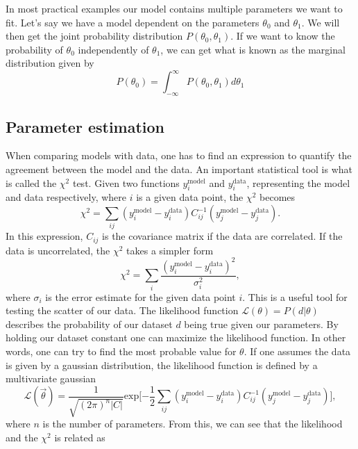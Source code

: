 In most practical examples our model contains multiple parameters we want to fit. Let's say we have a model
dependent on the parameters $\theta_0$ and $\theta_1$. We will then get the joint probability distribution $P(\theta_0, \theta_1)$.
If we want to know the probability of $\theta_0$ independently of $\theta_1$, we can get what is known as the marginal distribution given by
\begin{equation}
    P(\theta_0)=\int_{-\infty}^{\infty}P(\theta_0, \theta_1)d\theta_1
\end{equation}

\subsection{Parameter estimation}
When comparing models with data, one has to find an expression to quantify the
agreement between the model and the data. An important statistical tool is what
is called the $\chi^2$ test. Given two functions $y^{\mathrm{model}}_i$ and $y^{\mathrm{data}}_i$,
representing the model and data respectively, where $i$ is a given data point,
the $\chi^2$ becomes
\begin{equation}
    \chi^2=\sum_{ij}(y^{\mathrm{model}}_i-y^{\mathrm{data}}_i)C_{ij}^{-1}(y^{\mathrm{model}}_j-y^{\mathrm{data}}_j).
\end{equation}
In this expression, $C_{ij}$ is the covariance matrix if the data are correlated. If the data
is uncorrelated, the $\chi^2$ takes a simpler form
\begin{equation}
    \chi^2=\sum_{i}\frac{(y^{\mathrm{model}}_i-y^{\mathrm{data}}_i)^2}{\sigma_i^2},
\end{equation}
where $\sigma_i$ is the error estimate for the given data point $i$. This is a
useful tool for testing the scatter of our data. The likelihood function
$\mathcal{L}(\theta)=P(d\vert \theta)$ describes the probability of our dataset
$d$ being true given our parameters. By holding our dataset constant one can
maximize the likelihood function. In other words, one can try to find the most
probable value for $\theta$. If one assumes the data is given by a gaussian
distribution, the likelihood function is defined by a multivariate gaussian
\begin{equation}
    \mathcal{L}(\vec{\theta}) = \frac{1}{\sqrt{(2\pi)^n\vert C \vert}}\mathrm{exp}\big[{-\frac{1}{2}}\sum_{ij}(y^{\mathrm{model}}_i-y^{\mathrm{data}}_i)C_{ij}^{-1}(y^{\mathrm{model}}_j-y^{\mathrm{data}}_j)\big],
\end{equation}
where $n$ is the number of parameters. From this, we can see that the likelihood and the $\chi^2$ is related as
